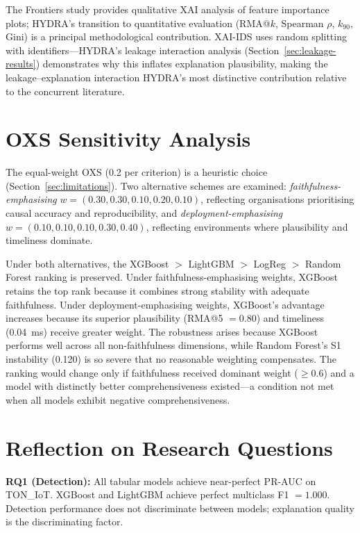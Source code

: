 \documentclass[12pt,a4paper]{report}
\begin{document}
The Frontiers study \cite{mohale2025} provides qualitative XAI analysis of feature importance plots; HYDRA's transition to quantitative evaluation (RMA@$k$, Spearman $\rho$, $k_{90}$, Gini) is a principal methodological contribution. XAI-IDS \cite{arreche2024b} uses random splitting with identifiers---HYDRA's leakage interaction analysis (Section~\ref{sec:leakage-results}) demonstrates why this inflates explanation plausibility, making the leakage--explanation interaction HYDRA's most distinctive contribution relative to the concurrent literature.

\section{OXS Sensitivity Analysis}
\label{sec:oxs-sensitivity}

The equal-weight OXS (0.2 per criterion) is a heuristic choice (Section~\ref{sec:limitations}). Two alternative schemes are examined: \textit{faithfulness-emphasising} $w = (0.30, 0.30, 0.10, 0.20, 0.10)$, reflecting organisations prioritising causal accuracy and reproducibility, and \textit{deployment-emphasising} $w = (0.10, 0.10, 0.10, 0.30, 0.40)$, reflecting environments where plausibility and timeliness dominate.

Under both alternatives, the XGBoost $>$ LightGBM $>$ LogReg $>$ Random Forest ranking is preserved. Under faithfulness-emphasising weights, XGBoost retains the top rank because it combines strong stability with adequate faithfulness. Under deployment-emphasising weights, XGBoost's advantage increases because its superior plausibility (RMA@5 $= 0.80$) and timeliness (0.04~ms) receive greater weight. The robustness arises because XGBoost performs well across all non-faithfulness dimensions, while Random Forest's S1 instability (0.120) is so severe that no reasonable weighting compensates. The ranking would change only if faithfulness received dominant weight ($\geq 0.6$) and a model with distinctly better comprehensiveness existed---a condition not met when all models exhibit negative comprehensiveness.

\section{Reflection on Research Questions}
\label{sec:rq-reflection}

\textbf{RQ1 (Detection):} All tabular models achieve near-perfect PR-AUC on TON\_IoT. XGBoost and LightGBM achieve perfect multiclass F1 $= 1.000$. Detection performance does not discriminate between models; explanation quality is the discriminating factor.
\end{document}
